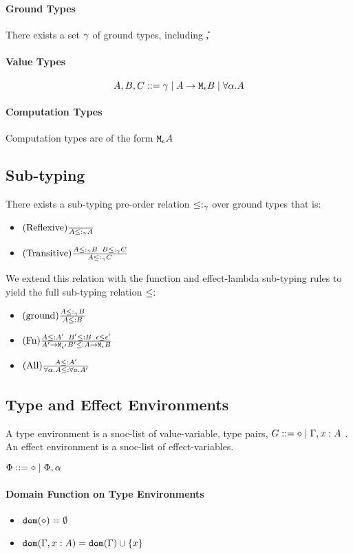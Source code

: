 {    \paragraph{Ground Types}
        There exists a set $\gamma$ of ground types, including \U, \B
    \paragraph{Value Types}
    $$ A, B, C ::= \gamma \mid A \rightarrow \texttt{M}_{\epsilon}{B} \mid \forall \alpha. A$$
    \paragraph{Computation Types}
    Computation types are of the form $\texttt{M}_{\epsilon}{A}$

\subsection{Sub-typing}
    There exists a sub-typing pre-order relation $\leq:_{\gamma}$ over ground types that is:
    \begin{itemize}
        \item $(\text{Reflexive}) \frac{}{A \leq:_{\gamma} A}$
        \item $(\text{Transitive}) \frac{A \leq:_{\gamma} B \; \; B \leq:_{\gamma} C}{A \leq:_{\gamma} C}$
    \end{itemize}

    We extend this relation with the function and effect-lambda sub-typing rules to yield the full sub-typing relation $\leq:$

    \begin{itemize}
        \item $(\text{ground}) \frac{A \leq:_{\gamma} B}{A \leq: B}$
        \item $(\text{Fn}) \frac{A \leq: A' \;\; B' \leq: B \; \; \epsilon \leq \epsilon'}{A' \rightarrow \texttt{M}_{\epsilon'}{B'} \leq: A \rightarrow \texttt{M}_{\epsilon}{B}}$
        \item $(\text{All}) \frac{A\leq: A'}{\forall \alpha. A\leq:\forall a. A'}$
    \end{itemize}
\subsection{Type and Effect Environments}
A type environment is a snoc-list of value-variable, type pairs, $G ::= \diamond \mid \Gamma, x: A$ .
An effect environment is a snoc-list of effect-variables.

$\Phi::=\diamond\mid\Phi, \alpha$
\paragraph{Domain Function on Type Environments}
\begin{itemize}
    \item $\texttt{dom}(\diamond) = \emptyset$
    \item $\texttt{dom}(\Gamma, x: A) =  \texttt{dom}(\Gamma)  \cup \left\{x \right\}$
\end{itemize}

}
